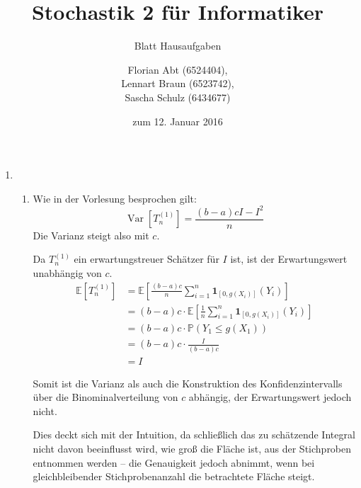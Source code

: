 \documentclass[a4paper]{scrartcl}
\title{Stochastik 2 für Informatiker}
\subtitle{Blatt {\blattnr} Hausaufgaben}
\author{
    Florian Abt (6524404), \\
    Lennart Braun (6523742), \\
    Sascha Schulz (6434677)
}
\date{zum 12. Januar 2016}
\newcommand{\prob}{\mathbb{P}}
\newcommand{\e}{\mathbb{E}}
\newcommand{\var}{\operatorname{Var}}
\def \blattnr {11}
\begin{document}
\maketitle

\begin{enumerate}[label=\bfseries \blattnr.\arabic*]
  \item %
    \begin{enumerate}
     \item %
         Wie in der Vorlesung besprochen gilt:
         \begin{equation*}
             \var\left[T_n^{(1)}\right] = \frac{(b-a)cI - I^2}{n}
         \end{equation*}
         Die Varianz steigt also mit $c$.
         
         
         Da $T_n^{(1)}$ ein erwartungstreuer Schätzer für $I$ ist, ist der
         Erwartungswert unabhängig von $c$.
         \begin{equation*}
             \begin{split}
                 \e\left[T_n^{(1)}\right]
                 &= \e \left[ \frac{(b-a)c}{n} \sum_{i=1}^n \mathbf{1}_{[0,g(X_i)]}(Y_i) \right] \\
                 &= (b-a)c \cdot \e \left[ \frac{1}{n} \sum_{i=1}^n \mathbf{1}_{[0,g(X_i)]}(Y_i) \right] \\
                 &= (b-a)c \cdot \prob(Y_1 \leq g(X_1)) \\
                 &= (b-a)c \cdot \frac{I}{(b-a)c} \\
                 &= I
             \end{split}
         \end{equation*}
         
	 Somit ist die Varianz als auch die Konstruktion des Konfidenzintervalls 
	 über die Binominalverteilung von $c$ abhängig, 
	 der Erwartungswert jedoch nicht. 
	 
	 Dies deckt sich mit der Intuition, da 
	 schließlich das zu schätzende Integral nicht davon beeinflusst wird, 
	 wie groß die Fläche ist, aus der Stichproben entnommen werden -- die 
	 Genauigkeit jedoch abnimmt, wenn bei gleichbleibender Stichprobenanzahl
	 die betrachtete Fläche steigt.
     

\end{enumerate}
\end{enumerate}
\end{document}
